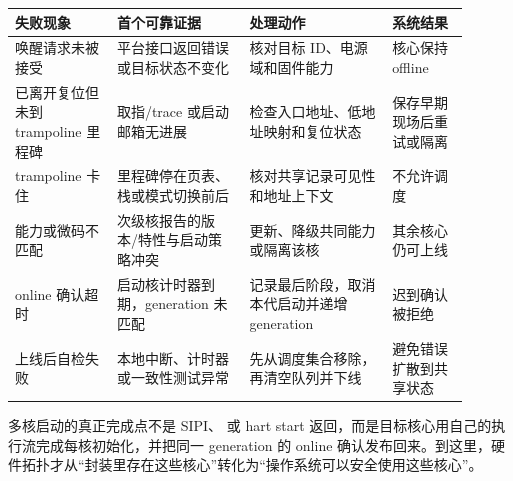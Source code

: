 \begin{longtable}{L{0.20\linewidth}L{0.26\linewidth}L{0.29\linewidth}L{0.15\linewidth}}
\toprule
失败现象 & 首个可靠证据 & 处理动作 & 系统结果 \\
\midrule
唤醒请求未被接受 & 平台接口返回错误或目标状态不变化 & 核对目标 ID、电源域和固件能力 & 核心保持 offline \\\tablerowrule
已离开复位但未到 trampoline 里程碑 & 取指/trace 或启动邮箱无进展 & 检查入口地址、低地址映射和复位状态 & 保存早期现场后重试或隔离 \\\tablerowrule
trampoline 卡住 & 里程碑停在页表、栈或模式切换前后 & 核对共享记录可见性和地址上下文 & 不允许调度 \\\tablerowrule
能力或微码不匹配 & 次级核报告的版本/特性与启动策略冲突 & 更新、降级共同能力或隔离该核 & 其余核心仍可上线 \\\tablerowrule
online 确认超时 & 启动核计时器到期，generation 未匹配 & 记录最后阶段，取消本代启动并递增 generation & 迟到确认被拒绝 \\\tablerowrule
上线后自检失败 & 本地中断、计时器或一致性测试异常 & 先从调度集合移除，再清空队列并下线 & 避免错误扩散到共享状态 \\
\bottomrule
\end{longtable}

多核启动的真正完成点不是 SIPI、 或 hart start 返回，而是目标核心用自己的执行流完成每核初始化，并把同一 generation 的 online 确认发布回来。到这里，硬件拓扑才从“封装里存在这些核心”转化为“操作系统可以安全使用这些核心”。
